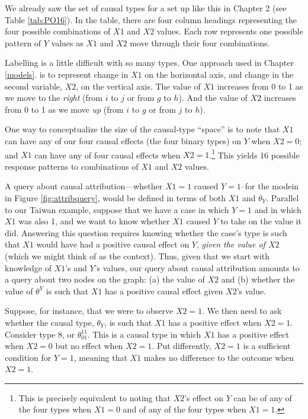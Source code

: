 \documentclass[12pt,]{book}
\let\rmarkdownfootnote\footnote%
\def\footnote{\protect\rmarkdownfootnote}
\begin{document}
We already saw the set of causal types for a set up like this in Chapter 2 (see Table \ref{tab:PO16}). In the table, there are four column headings representing the four possible combinations of \(X1\) and \(X2\) values. Each row represents one possible pattern of \(Y\) values as \(X1\) and \(X2\) move through their four combinations.

Labelling is a little difficult with so many types. One approach used in Chapter \ref{models}. is to represent change in \(X1\) on the horizontal axis, and change in the second variable, \(X2\), on the vertical axis. The value of \(X1\) increases from 0 to 1 as we move to the \emph{right} (from \(i\) to \(j\) or from \(g\) to \(h\)). And the value of \(X2\) increases from 0 to 1 as we move \emph{up} (from \(i\) to \(g\) or from \(j\) to \(h\)).

One way to conceptualize the size of the causal-type ``space'' is to note that \(X1\) can have any of our four causal effects (the four binary types) on \(Y\) when \(X2=0\); and \(X1\) can have any of four causal effects when \(X2=1\).\footnote{This is precisely equivalent to noting that \(X2\)'s effect on \(Y\) can be of any of the four types when \(X1=0\) and of any of the four types when \(X1=1\).} This yields 16 possible response patterns to combinations of \(X1\) and \(X2\) values.

A query about causal attribution---whether \(X1 = 1\) caused \(Y=1\)--for the modein in Figure \ref{fig:attribquery}, would be defined in terms of both \(X1\) and \(\theta_Y\). Parallel to our Taiwan example, suppose that we have a case in which \(Y=1\) and in which \(X1\) was also 1, and we want to know whether \(X1\) caused \(Y\) to take on the value it did. Answering this question requires knowing whether the case's type is such that \(X1\) would have had a positive causal effect on \(Y\), \emph{given the value of \(X2\)} (which we might think of as the context). Thus, given that we start with knowledge of \(X1\)'s and \(Y\)'s values, our query about causal attribution amounts to a query about two nodes on the graph: (a) the value of \(X2\) and (b) whether the value of \(\theta^Y\) is such that \(X1\) has a positive causal effect given \(X2\)'s value.

Suppose, for instance, that we were to observe \(X2=1\). We then need to ask whether the causal type, \(\theta_Y\), is such that \(X1\) has a positive effect when \(X2=1\). Consider type 8, or \(\theta_{01}^{11}\). This is a causal type in which \(X1\) has a positive effect when \(X2=0\) but no effect when \(X2=1\). Put differently, \(X2=1\) is a sufficient condition for \(Y=1\), meaning that \(X1\) makes no difference to the outcome when \(X2=1\).
\end{document}

